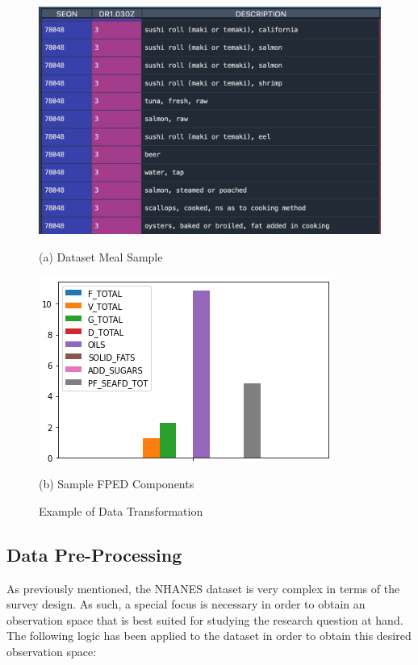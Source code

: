 \documentclass{article}
\begin{document}
\begin{figure}[htb]
\begin{minipage}[b]{.48\linewidth}
  \centering
  \centerline{\includegraphics[scale=0.175]{sushi_meal_desc.png}}
  \centerline{(a) Dataset Meal Sample}\medskip
\end{minipage}
\hfill
\begin{minipage}[b]{0.48\linewidth}
  \centering
  \centerline{\includegraphics[scale=0.3]{sushi_meal.png}}
  \centerline{(b) Sample FPED Components}\medskip
\end{minipage}
\caption{Example of Data Transformation}
\label{fig:res}
\end{figure}

\subsection{Data Pre-Processing}
\label{ssec:subhead}

As previously mentioned, the NHANES dataset is very complex in terms of the survey design. As such, a special focus is necessary in order to obtain an observation space that is best suited for studying the research question at hand. The following logic has been applied to the dataset in order to obtain this desired observation space:
\end{document}
